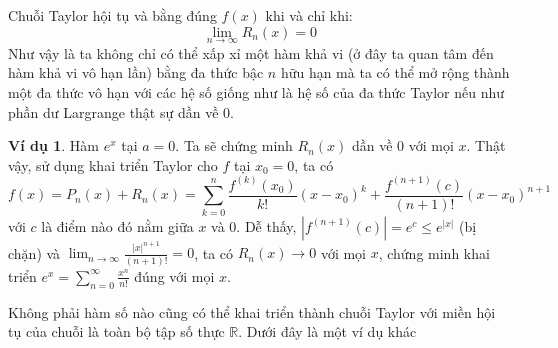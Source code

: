 \documentclass[12pt]{article}
\theoremstyle{definition}
\newtheorem*{example}{Ví dụ}
\theoremstyle{remark}
\begin{document}
Chuỗi Taylor hội tụ và bằng đúng $f(x)$ khi và chỉ khi:
\[
\lim_{n \to \infty} R_n(x) = 0
\]
Như vậy là ta không chỉ có thể xấp xỉ một hàm khả vi (ở đây ta quan tâm đến hàm khả vi vô hạn lần) bằng đa thức bậc $n$ hữu hạn mà ta có thể mở rộng thành một đa thức vô hạn với các hệ số giống như là hệ số của đa thức Taylor nếu như phần dư Largrange thật sự dần về $0$.
\begin{example}
    
 Hàm $e^x$ tại $a=0$. Ta sẽ chứng minh $R_n(x)$ dần về 0 với mọi $x$. Thật vậy, sử dụng khai triển Taylor cho $f$ tại $x_0=0$, ta có
 \begin{equation}
     f(x) = P_n(x) + R_n(x) = \sum_{k=0}^{n} \frac{f^{(k)}(x_0)}{k!} (x-x_0)^k + \frac{f^{(n+1)}(c)}{(n+1)!} (x-x_0)^{n+1}
 \end{equation} với $c$ là điểm nào đó nằm giữa $x$ và $0$.
 Dễ thấy, $|f^{(n+1)}(c)| = e^c \le e^{|x|}$ (bị chặn) và $\lim_{n \to \infty} \frac{|x|^{n+1}}{(n+1)!} = 0$, ta có $R_n(x) \to 0$ với mọi $x$, chứng minh khai triển $e^x = \sum_{n=0}^{\infty} \frac{x^n}{n!}$ đúng với mọi $x$.
\end{example}
Không phải hàm số nào cũng có thể khai triển thành chuỗi Taylor với miền hội tụ của chuỗi là toàn bộ tập số thực $\mathbb{R}$. Dưới đây là một ví dụ khác
\end{document}

